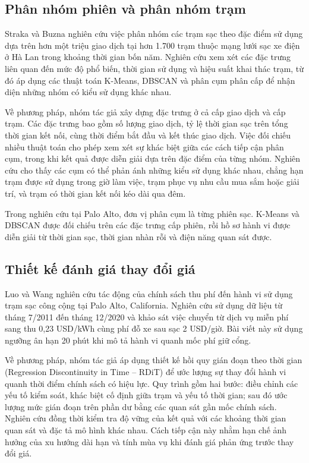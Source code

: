 \documentclass[conference,a4paper]{IEEEtran}
\begin{document}
\subsection{Phân nhóm phiên và phân nhóm trạm}

Straka và Buzna \cite{straka2019} nghiên cứu việc phân nhóm các trạm sạc theo đặc điểm sử dụng dựa trên hơn một triệu giao dịch tại hơn 1.700 trạm thuộc mạng lưới sạc xe điện ở Hà Lan trong khoảng thời gian bốn năm. Nghiên cứu xem xét các đặc trưng liên quan đến mức độ phổ biến, thời gian sử dụng và hiệu suất khai thác trạm, từ đó áp dụng các thuật toán K-Means, DBSCAN và phân cụm phân cấp để nhận diện những nhóm có kiểu sử dụng khác nhau.

Về phương pháp, nhóm tác giả xây dựng đặc trưng ở cả cấp giao dịch và cấp trạm. Các đặc trưng bao gồm số lượng giao dịch, tỷ lệ thời gian sạc trên tổng thời gian kết nối, cùng thời điểm bắt đầu và kết thúc giao dịch. Việc đối chiếu nhiều thuật toán cho phép xem xét sự khác biệt giữa các cách tiếp cận phân cụm, trong khi kết quả được diễn giải dựa trên đặc điểm của từng nhóm. Nghiên cứu cho thấy các cụm có thể phản ánh những kiểu sử dụng khác nhau, chẳng hạn trạm được sử dụng trong giờ làm việc, trạm phục vụ nhu cầu mua sắm hoặc giải trí, và trạm có thời gian kết nối kéo dài qua đêm.

Trong nghiên cứu tại Palo Alto, đơn vị phân cụm là từng phiên sạc. K-Means và DBSCAN được đối chiếu trên các đặc trưng cấp phiên, rồi hồ sơ hành vi được diễn giải từ thời gian sạc, thời gian nhàn rỗi và điện năng quan sát được.

\subsection{Thiết kế đánh giá thay đổi giá}

Luo và Wang \cite{luowang2025} nghiên cứu tác động của chính sách thu phí đến hành vi sử dụng trạm sạc công cộng tại Palo Alto, California. Nghiên cứu sử dụng dữ liệu từ tháng 7/2011 đến tháng 12/2020 và khảo sát việc chuyển từ dịch vụ miễn phí sang thu 0,23 USD/kWh cùng phí đỗ xe sau sạc 2 USD/giờ. Bài viết này sử dụng ngưỡng ân hạn 20 phút khi mô tả hành vi quanh mốc phí giữ cổng.

Về phương pháp, nhóm tác giả áp dụng thiết kế hồi quy gián đoạn theo thời gian (Regression Discontinuity in Time – RDiT) để ước lượng sự thay đổi hành vi quanh thời điểm chính sách có hiệu lực. Quy trình gồm hai bước: điều chỉnh các yếu tố kiểm soát, khác biệt cố định giữa trạm và yếu tố thời gian; sau đó ước lượng mức gián đoạn trên phần dư bằng các quan sát gần mốc chính sách. Nghiên cứu đồng thời kiểm tra độ vững của kết quả với các khoảng thời gian quan sát và đặc tả mô hình khác nhau. Cách tiếp cận này nhằm hạn chế ảnh hưởng của xu hướng dài hạn và tính mùa vụ khi đánh giá phản ứng trước thay đổi giá.
\end{document}
